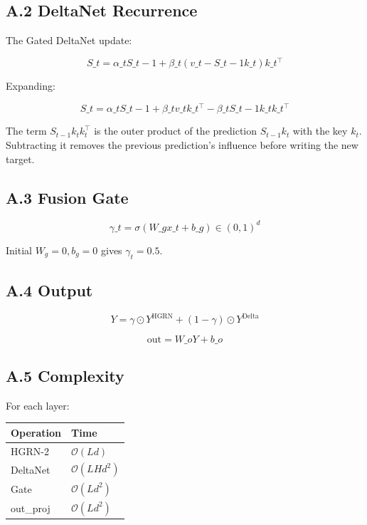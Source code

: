 \subsection{A.2 DeltaNet Recurrence}

The Gated DeltaNet update:

\[
S\_t = \alpha\_t S\_{t-1} + \beta\_t (v\_t - S\_{t-1} k\_t) k\_t^\top
\tag{A.3}
\]

Expanding:

\[
S\_t = \alpha\_t S\_{t-1} + \beta\_t v\_t k\_t^\top - \beta\_t S\_{t-1} k\_t k\_t^\top
\tag{A.4}
\]

The term $S_{t-1} k_t k_t^\top$ is the outer product of the prediction 
$S_{t-1} k_t$ with the key $k_t$. Subtracting it removes the previous 
prediction's influence before writing the new target.

\subsection{A.3 Fusion Gate}

\[
\gamma\_t = \sigma(W\_g x\_t + b\_g) \in (0, 1)^d
\tag{A.5}
\]

Initial $W_g = 0, b_g = 0$ gives $\gamma_t = 0.5$.

\subsection{A.4 Output}

\[
Y = \gamma \odot Y^\text{HGRN} + (1 - \gamma) \odot Y^\text{Delta}
\tag{A.6}
\]

\[
\text{out} = W\_o Y + b\_o
\tag{A.7}
\]

\subsection{A.5 Complexity}

For each layer:

\begin{table}[H]
\centering
\small
\begin{tabular}{ll}
\toprule
\textbf{Operation} & \textbf{Time} \\
\midrule
HGRN-2 & $\mathcal{O}(L d)$ \\
DeltaNet & $\mathcal{O}(L H d^2)$ \\
Gate & $\mathcal{O}(L d^2)$ \\
out\_proj & $\mathcal{O}(L d^2)$ \\
\bottomrule
\end{tabular}
\end{table}

